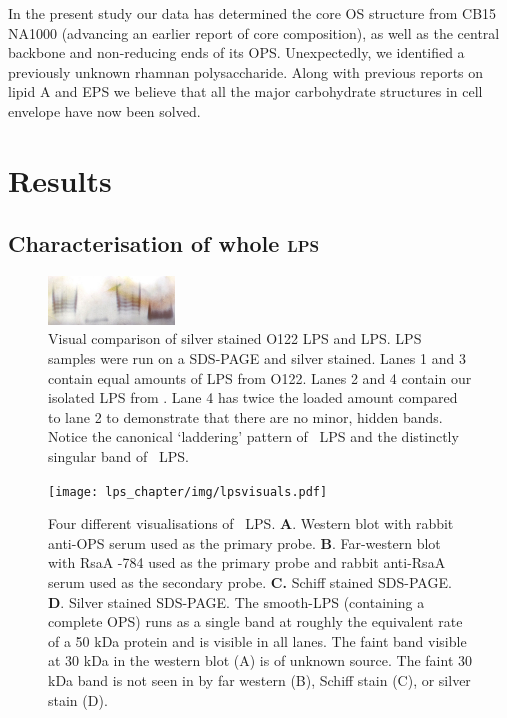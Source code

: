	In the present study our data has determined the core \ac{OS} structure from \caulobacter CB15 NA1000 (advancing an earlier report of core composition), as well as the central backbone and non-reducing ends of its \ac{OPS}. Unexpectedly, we identified a previously unknown rhamnan polysaccharide. Along with previous reports on lipid A and \ac{EPS} we believe that all the major carbohydrate structures in \caulobacter cell envelope have now been solved.

\section{Results} %
\label{sec:results}
	\subsection{Characterisation of whole \textsc{lps}} %
	\label{sub:characterisation_of_whole_lps}
		\begin{figure}[htb]
			\begin{center}
				\includegraphics[width=0.3\textwidth]{lps_chapter/img/lpssilverstain.jpg}
			\end{center}
			\caption[Visual comparison of \ecoli O122 \ac{LPS} and \caulobacter \ac{LPS}]{Visual comparison of silver stained \ecoli O122 \ac{LPS} and \caulobacter \ac{LPS}. \ac{LPS} samples were run on a \ac{SDS-PAGE} and silver stained. Lanes 1 and 3 contain equal amounts of \ac{LPS} from \ecoli O122. Lanes 2 and 4 contain our isolated \ac{LPS} from \caulobacter. Lane 4 has twice the loaded amount compared to lane 2 to demonstrate that there are no minor, hidden bands. Notice the canonical `laddering' pattern of \ecoli\ \ac{LPS} and the distinctly singular band of \caulobacter\ \ac{LPS}.}
			\label{fig:lpssilverstain}
		\end{figure}

		\begin{figure}[htp]
			\begin{center}
				\texttt{[image: lps\_chapter/img/lpsvisuals.pdf]}
			\end{center}
			\caption[Four different visualisations of \caulobacter\ \ac{LPS}.]{Four different visualisations of \caulobacter\ \ac{LPS}. \textbf{A}. Western blot with rabbit anti-\ac{OPS} serum used as the primary probe. \textbf{B}. Far-western blot with RsaA -784 used as the primary probe and rabbit anti-RsaA serum used as the secondary probe. \textbf{C.} Schiff stained \ac{SDS-PAGE}. \textbf{D}. Silver stained \ac{SDS-PAGE}. The smooth-\ac{LPS} (\ie containing a complete \ac{OPS}) runs as a single band at roughly the equivalent rate of a 50 kDa protein and is visible in all lanes. The faint band visible at 30 kDa in the western blot (A) is of unknown source. The faint 30 kDa band is not seen in by far western (B), Schiff stain (C), or silver stain (D).}
			\label{fig:lpsvisuals}
		\end{figure}

